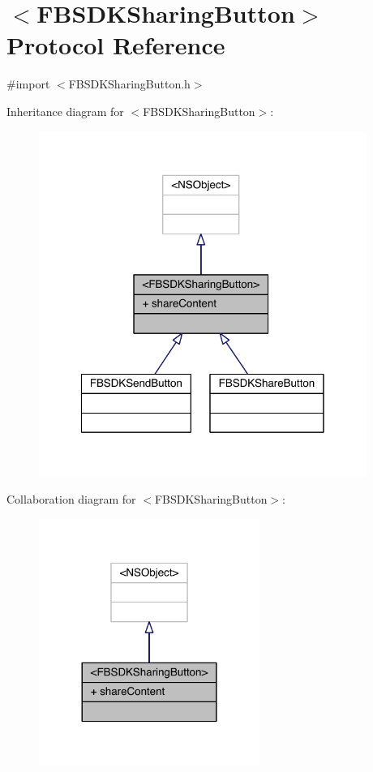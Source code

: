 \hypertarget{protocol_f_b_s_d_k_sharing_button-p}{\section{$<$F\-B\-S\-D\-K\-Sharing\-Button$>$ Protocol Reference}
\label{protocol_f_b_s_d_k_sharing_button-p}
}


{\ttfamily \#import $<$F\-B\-S\-D\-K\-Sharing\-Button.\-h$>$}



Inheritance diagram for $<$F\-B\-S\-D\-K\-Sharing\-Button$>$\-:
\nopagebreak
\begin{figure}[H]
\begin{center}
\leavevmode
\includegraphics[width=303pt]{protocol_f_b_s_d_k_sharing_button-p__inherit__graph}
\end{center}
\end{figure}


Collaboration diagram for $<$F\-B\-S\-D\-K\-Sharing\-Button$>$\-:
\nopagebreak
\begin{figure}[H]
\begin{center}
\leavevmode
\includegraphics[width=204pt]{protocol_f_b_s_d_k_sharing_button-p__coll__graph}
\end{center}
\end{figure}
